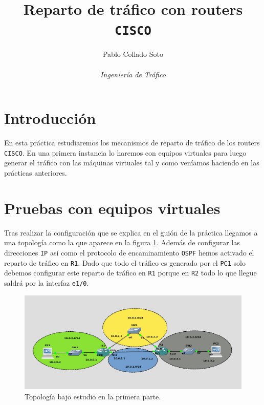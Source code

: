 \documentclass[11pt]{article}
\title{Reparto de tráfico con routers \texttt{CISCO}}
\author{Pablo Collado Soto \\ \\ \textit{Ingeniería de Tráfico}}
\date{}
\begin{document}
    \maketitle

    \section{Introducción}
        En esta práctica estudiaremos los mecanismos de reparto de tráfico de los routers \texttt{CISCO}. En una primera instancia lo haremos con equipos virtuales para luego generar el tráfico con las máquinas virtuales tal y como veníamos haciendo en las prácticas anteriores.

    \section{Pruebas con equipos virtuales}
        Tras realizar la configuración que se explica en el guión de la práctica llegamos a una topología como la que aparece en la figura \ref{fig:topology}. Además de configurar las direcciones \texttt{IP} así como el protocolo de encaminamiento \texttt{OSPF} hemos activado el reparto de tráfico en \texttt{R1}. Dado que todo el tráfico es generado por el \texttt{PC1} solo debemos configurar este reparto de tráfico en \texttt{R1} porque en \texttt{R2} todo lo que llegue saldrá por la interfaz \texttt{e1/0}.\\

        \begin{figure}
            \centering
            \includegraphics[width=0.6\linewidth]{topology.png}
            \caption{Topología bajo estudio en la primera parte.}
            \label{fig:topology}
        \end{figure}
\end{document}
